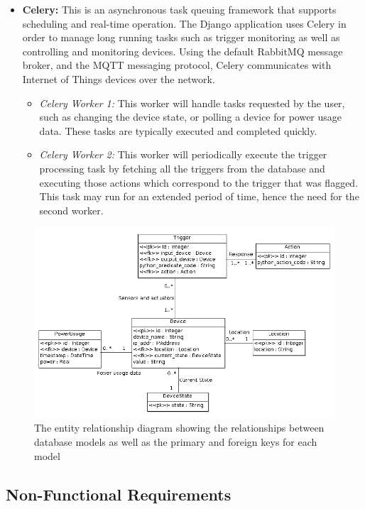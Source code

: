 \documentclass[10pt,twocolumn]{witseiepaper}
\begin{document}
\begin{itemize}
\begin{itemize}
		\end{itemize}
		\item \textbf{Celery:} 
		This is an asynchronous task queuing framework that supports scheduling and real-time operation. The Django application uses Celery in order to manage long running tasks such as trigger monitoring as well as controlling and monitoring devices. Using the default RabbitMQ message broker, and the MQTT messaging protocol, Celery communicates with Internet of Things devices over the network. 
		\begin{itemize}
			\item \textit{Celery Worker 1:} This worker will handle tasks requested by the user, such as changing the device state, or polling a device for power usage data. These tasks are typically executed and completed quickly.
			\item \textit{Celery Worker 2:} This worker will periodically execute the trigger processing task by fetching all the triggers from the database and executing those actions which correspond to the trigger that was flagged. This task may run for an extended period of time, hence the need for the second worker.
		\end{itemize}
	\end{itemize}
	
	\begin{figure}[H]
		\centering
		\includegraphics[width=\linewidth]{ER}
		\caption{The entity relationship diagram showing the relationships between database models as well as the primary and foreign keys for each model}
		\label{fig:databaseModels}
	\end{figure}
		
	\subsection{Non-Functional Requirements}
\end{document}
